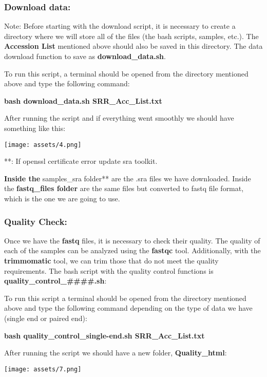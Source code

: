 \documentclass[
]{article}
\begin{document}
\subsubsection{Download data:}\label{download-data}

Note: Before starting with the download script, it is necessary to
create a directory where we will store all of the files (the bash
scripts, samples, etc.). The \textbf{Accession List} mentioned above
should also be saved in this directory. The data download function to
save as \textbf{download\_data.sh}.

To run this script, a terminal should be opened from the directory
mentioned above and type the following command:

\textbf{bash download\_data.sh SRR\_Acc\_List.txt}

After running the script and if everything went smoothly we should have
something like this:

\texttt{[image: assets/4.png]}

**: If openssl certificate error update sra toolkit.

\textbf{Inside the} samples\_sra folder** are the .sra files we have
downloaded. Inside the \textbf{fastq\_files folder} are the same files
but converted to fastq file format, which is the one we are going to
use.

\subsubsection{Quality Check:}\label{quality-check}

Once we have the \textbf{fastq} files, it is necessary to check their
quality. The quality of each of the samples can be analyzed using the
\textbf{fastqc} tool. Additionally, with the \textbf{trimmomatic} tool,
we can trim those that do not meet the quality requirements. The bash
script with the quality control functions is
\textbf{quality\_control\_\#\#\#\#.sh}:

To run this script a terminal should be opened from the directory
mentioned above and type the following command depending on the type of
data we have (single end or paired end):

\textbf{bash quality\_control\_single-end.sh SRR\_Acc\_List.txt}

After running the script we should have a new folder,
\textbf{Quality\_html}:

\texttt{[image: assets/7.png]}
\end{document}
